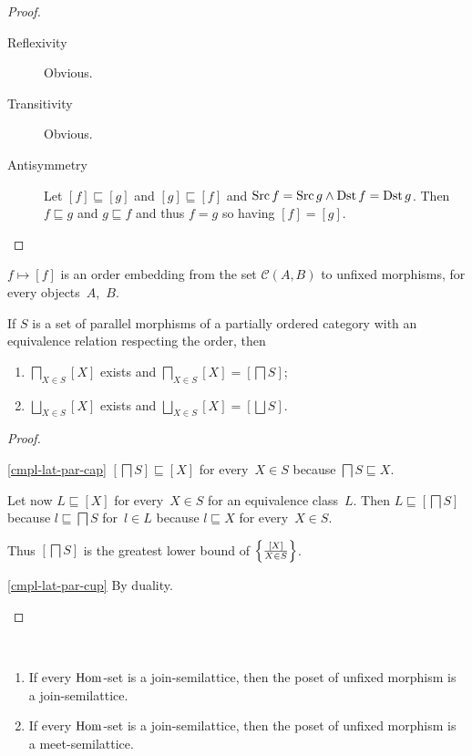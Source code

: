 \begin{proof}
~
\begin{description}
\item[Reflexivity] Obvious.
\item[Transitivity] Obvious.
\item[Antisymmetry] Let $[f]\sqsubseteq[g]$ and
$[g]\sqsubseteq[f]$ and $\operatorname{Src} f=\operatorname{Src} g\land\operatorname{Dst} f=\operatorname{Dst} g$.
Then $f\sqsubseteq g$ and $g\sqsubseteq f$ and thus
$f=g$ so having $[f]=[g]$.
\end{description}
\end{proof}

\begin{obvious}\label{unfix-mor-emb}
$f\mapsto[f]$ is an order embedding from the set
$\mathcal{C}(A,B)$ to unfixed morphisms, for every
objects~$A$,~$B$.
\end{obvious}

\begin{prop}\label{cmpl-lat-par}
If $S$ is a set of parallel morphisms of a partially ordered
category with an equivalence relation respecting the order, then
\begin{enumerate}
\item\label{cmpl-lat-par-cap}
$\bigsqcap_{X\in S}[X]$ exists and 
$\bigsqcap_{X\in S}[X]=[\bigsqcap S]$;

\item\label{cmpl-lat-par-cup}
$\bigsqcup_{X\in S}[X]$ exists and 
$\bigsqcup_{X\in S}[X]=[\bigsqcup S]$.
\end{enumerate}
\end{prop}

\begin{proof}
~
\begin{widedisorder}
\item[\ref{cmpl-lat-par-cap}]
$[\bigsqcap S]\sqsubseteq[X]$ for every~$X\in S$ because
$\bigsqcap S\sqsubseteq X$.

Let now $L\sqsubseteq[X]$ for every~$X\in S$ for an
equivalence class~$L$. Then $L\sqsubseteq[\bigsqcap S]$
because $l\sqsubseteq\bigsqcap S$ for~$l\in L$ because
$l\sqsubseteq X$ for every~$X\in S$.

Thus $[\bigsqcap S]$ is the greatest lower bound of
$\left\{ \frac{[X]}{X\in S}\right\}$.

\item[\ref{cmpl-lat-par-cup}] By duality.
\end{widedisorder}
\end{proof}

\begin{prop}
~
\begin{enumerate}
\item If every $\operatorname{Hom}$-set is a join-semilattice, then
the poset of unfixed morphism is a join-semilattice.
\item If every $\operatorname{Hom}$-set is a join-semilattice, then
the poset of unfixed morphism is a meet-semilattice.
\end{enumerate}
\end{prop}

